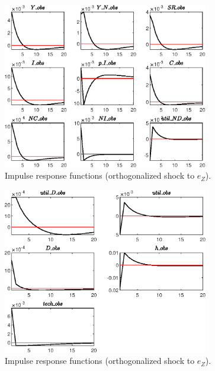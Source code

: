 \begin{figure}[H]
\centering 
\includegraphics[width=0.80\textwidth]{BRS_sectoral/graphs/BRS_sectoral_IRF_e_Z1}
\caption{Impulse response functions (orthogonalized shock to ${e_Z}$).}\label{Fig:IRF:e_Z:1}
\end{figure}
 
\begin{figure}[H]
\centering 
\includegraphics[width=0.80\textwidth]{BRS_sectoral/graphs/BRS_sectoral_IRF_e_Z2}
\caption{Impulse response functions (orthogonalized shock to ${e_Z}$).}\label{Fig:IRF:e_Z:2}
\end{figure}
 
